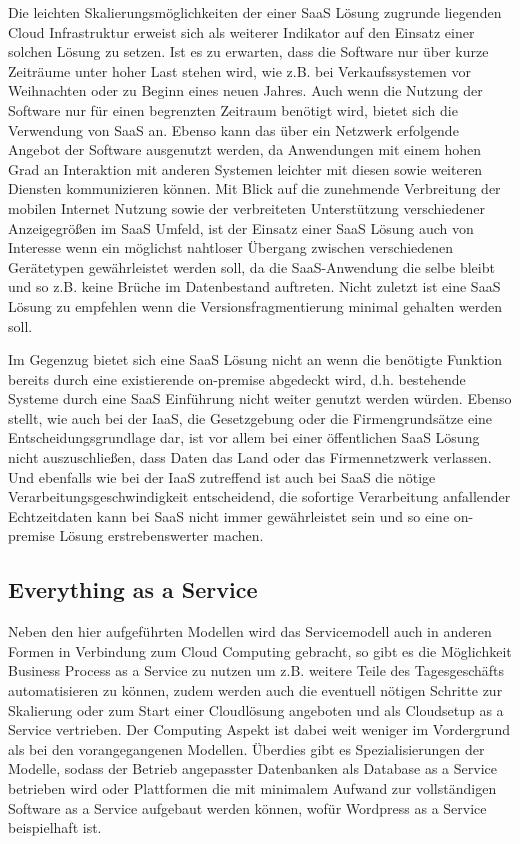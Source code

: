 Die leichten Skalierungsmöglichkeiten der einer SaaS Lösung zugrunde liegenden Cloud Infrastruktur erweist sich als weiterer Indikator auf den Einsatz einer solchen Lösung zu setzen. Ist es zu erwarten, dass die Software nur über kurze Zeiträume unter hoher Last stehen wird, wie z.B. bei Verkaufssystemen vor Weihnachten oder zu Beginn eines neuen Jahres. Auch wenn die Nutzung der Software nur für einen begrenzten Zeitraum benötigt wird, bietet sich die Verwendung von SaaS an. Ebenso kann das über ein Netzwerk erfolgende Angebot der Software ausgenutzt werden, da Anwendungen mit einem hohen Grad an Interaktion mit anderen Systemen leichter mit diesen sowie weiteren Diensten kommunizieren können. Mit Blick auf die zunehmende Verbreitung der mobilen Internet Nutzung sowie der verbreiteten Unterstützung verschiedener Anzeigegrößen im SaaS Umfeld, ist der Einsatz einer SaaS Lösung auch von Interesse wenn ein möglichst nahtloser Übergang zwischen verschiedenen Gerätetypen gewährleistet werden soll, da die SaaS-Anwendung die selbe bleibt und so z.B. keine Brüche im Datenbestand auftreten. Nicht zuletzt ist eine SaaS Lösung zu empfehlen wenn die Versionsfragmentierung minimal gehalten werden soll.

Im Gegenzug bietet sich eine SaaS Lösung nicht an wenn die benötigte Funktion bereits durch eine existierende on-premise abgedeckt wird, d.h. bestehende Systeme durch eine SaaS Einführung nicht weiter genutzt werden würden. Ebenso stellt, wie auch bei der IaaS, die Gesetzgebung oder die Firmengrundsätze eine Entscheidungsgrundlage dar, ist vor allem bei einer öffentlichen SaaS Lösung nicht auszuschließen, dass Daten das Land oder das Firmennetzwerk verlassen. Und ebenfalls wie bei der IaaS zutreffend ist auch bei SaaS die nötige Verarbeitungsgeschwindigkeit entscheidend, die sofortige Verarbeitung anfallender Echtzeitdaten kann bei SaaS nicht immer gewährleistet sein und so eine on-premise Lösung erstrebenswerter machen.

\subsection{Everything as a Service}
Neben den hier aufgeführten Modellen wird das Servicemodell auch in anderen Formen in Verbindung zum Cloud Computing gebracht, so gibt es die Möglichkeit Business Process as a Service zu nutzen um z.B. weitere Teile des Tagesgeschäfts automatisieren zu können, zudem werden auch die eventuell nötigen Schritte zur Skalierung oder zum Start einer Cloudlösung angeboten und als Cloudsetup as a Service vertrieben. Der Computing Aspekt ist dabei weit weniger im Vordergrund als bei den vorangegangenen Modellen. Überdies gibt es Spezialisierungen der Modelle, sodass der Betrieb angepasster Datenbanken als Database as a Service betrieben wird oder Plattformen die mit minimalem Aufwand zur vollständigen Software as a Service aufgebaut werden können, wofür Wordpress as a Service beispielhaft ist.


